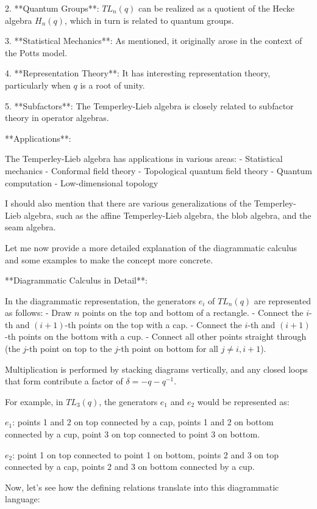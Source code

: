 \documentclass[12p]{article}
\newcounter{reasoningcounter}
\newenvironment{reasoning}[1][]
{\refstepcounter{reasoningcounter}%
\begin{tcolorbox}[
    title=Reasoning \thereasoningcounter: #1,
    colback=white, %
    colframe=gray,
    coltext=black, %
    fonttitle=\bfseries\normalsize,
    top=2mm,
    bottom=2mm,
    enlarge top initially by=5mm
]
\small
}
{\end{tcolorbox}}
\begin{document}
\begin{reasoning}
2. **Quantum Groups**: $TL_n(q)$ can be realized as a quotient of the Hecke algebra $H_n(q)$, which in turn is related to quantum groups.

3. **Statistical Mechanics**: As mentioned, it originally arose in the context of the Potts model.

4. **Representation Theory**: It has interesting representation theory, particularly when $q$ is a root of unity.

5. **Subfactors**: The Temperley-Lieb algebra is closely related to subfactor theory in operator algebras.

**Applications**:

The Temperley-Lieb algebra has applications in various areas:
- Statistical mechanics
- Conformal field theory
- Topological quantum field theory
- Quantum computation
- Low-dimensional topology

I should also mention that there are various generalizations of the Temperley-Lieb algebra, such as the affine Temperley-Lieb algebra, the blob algebra, and the seam algebra.

Let me now provide a more detailed explanation of the diagrammatic calculus and some examples to make the concept more concrete.

**Diagrammatic Calculus in Detail**:

In the diagrammatic representation, the generators $e_i$ of $TL_n(q)$ are represented as follows:
- Draw $n$ points on the top and bottom of a rectangle.
- Connect the $i$-th and $(i+1)$-th points on the top with a cap.
- Connect the $i$-th and $(i+1)$-th points on the bottom with a cup.
- Connect all other points straight through (the $j$-th point on top to the $j$-th point on bottom for all $j \neq i, i+1$).

Multiplication is performed by stacking diagrams vertically, and any closed loops that form contribute a factor of $\delta = -q - q^{-1}$.

For example, in $TL_3(q)$, the generators $e_1$ and $e_2$ would be represented as:

$e_1$: points 1 and 2 on top connected by a cap, points 1 and 2 on bottom connected by a cup, point 3 on top connected to point 3 on bottom.

$e_2$: point 1 on top connected to point 1 on bottom, points 2 and 3 on top connected by a cap, points 2 and 3 on bottom connected by a cup.

Now, let's see how the defining relations translate into this diagrammatic language:


\end{reasoning}
\end{document}
